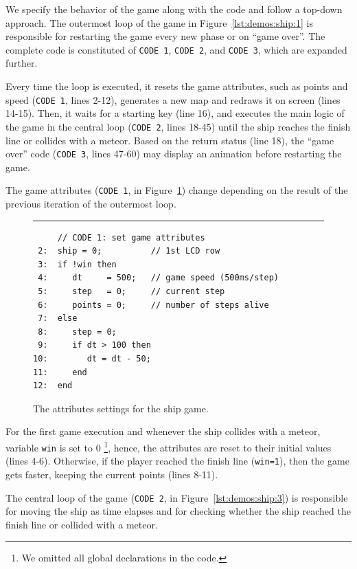 \documentclass{sigplan-proc}
\newcommand{\2}{\;\;}
\newcommand{\5}{\;\;\;\;\;}
\newcommand{\code}[1] {{\small{\texttt{#1}}}}
\begin{document}
We specify the behavior of the game along with the code and follow a top-down 
approach.
The outermost loop of the game in Figure~\ref{lst:demos:ship:1} is responsible 
for restarting the game every new phase or on ``game over''.
The complete code is constituted of \code{CODE~1}, \code{CODE~2}, and 
\code{CODE~3}, which are expanded further.

Every time the loop is executed, it resets the game attributes, such as points 
and speed (\code{CODE 1}, lines 2-12), generates a new map and redraws it on 
screen (lines 14-15).
Then, it waits for a starting key (line 16), and executes the main logic of the 
game in the central loop (\code{CODE 2}, lines 18-45) until the ship reaches 
the finish line or collides with a meteor.
Based on the return status (line 18), the ``game over'' code (\code{CODE 3}, 
lines 47-60) may display an animation before restarting the game.

The game attributes (\code{CODE 1}, in Figure~\ref{lst:demos:ship:2}) change 
depending on the result of the previous iteration of the outermost loop.

\begin{figure}[t]
\rule{8.5cm}{0.37pt}
{\small
\begin{verbatim}
     // CODE 1: set game attributes
 2:  ship = 0;          // 1st LCD row
 3:  if !win then
 4:     dt     = 500;   // game speed (500ms/step)
 5:     step   = 0;     // current step
 6:     points = 0;     // number of steps alive
 7:  else
 8:     step = 0;
 9:     if dt > 100 then
10:        dt = dt - 50;
11:     end
12:  end
\end{verbatim}
}
\caption{ The attributes settings for the ship game.
\label{lst:demos:ship:2}
}
\end{figure}

For the first game execution and whenever the ship collides with a meteor, 
variable \code{win} is set to 0%
\footnote{We omitted all global declarations in the code.},
hence, the attributes are reset to their initial values (lines 4-6).
Otherwise, if the player reached the finish line (\code{win=1}), then the game 
gets faster, keeping the current points (lines 8-11).

The central loop of the game (\code{CODE 2}, in Figure~\ref{lst:demos:ship:3}) 
is responsible for moving the ship as time elapses and for checking whether the 
ship reached the finish line or collided with a meteor.
\end{document}
